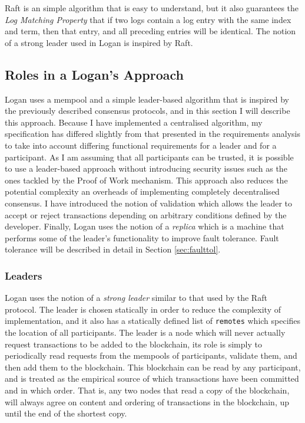 \documentclass[12pt,a4paper,twoside,openright]{report}
\begin{document}
	Raft is an simple algorithm that is easy to understand, but it also guarantees the \textit{Log Matching Property} that if two logs contain a log entry with the same index and term, then that entry, and all preceding entries will be identical.
	The notion of a strong leader used in Logan is inspired by Raft.

	\subsection{Roles in a Logan's Approach}
	Logan uses a mempool and a simple leader-based algorithm that is inspired by the previously described consensus protocols, and in this section I will describe this approach.
	Because I have implemented a centralised algorithm, my specification has differed slightly from that presented in the requirements analysis to take into account differing functional requirements for a leader and for a participant.
	As I am assuming that all participants can be trusted, it is possible to use a leader-based approach without introducing security issues such as the ones tackled by the Proof of Work mechanism. 
	This approach also reduces the potential complexity an overheads of implementing completely decentralised consensus.
	I have introduced the notion of validation which allows the leader to accept or reject transactions depending on arbitrary conditions defined by the developer.
	Finally, Logan uses the notion of a \textit{replica} which is a machine that performs some of the leader's functionality to improve fault tolerance.
	Fault tolerance will be described in detail in Section \ref{sec:faulttol}.
	
	\subsubsection*{Leaders}
	Logan uses the notion of a \textit{strong leader} similar to that used by the Raft protocol. 
	The leader is chosen statically in order to reduce the complexity of implementation, and it also has a statically defined list of \texttt{remotes} which specifies the location of all participants.
	The leader is a node which will never actually request transactions to be added to the blockchain, its role is simply to periodically read requests from the mempools of participants, validate them, and then add them to the blockchain.
	This blockchain can be read by any participant, and is treated as the empirical source of which transactions have been committed and in which order. 
	That is, any two nodes that read a copy of the blockchain, will always agree on content and ordering of transactions in the blockchain, up until the end of the shortest copy.\\
\end{document}
